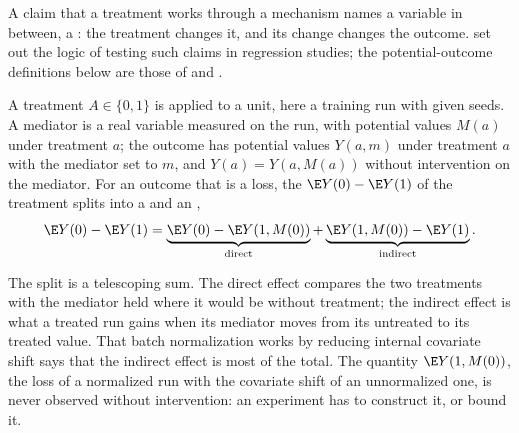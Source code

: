 \begin{refsection}
A claim that a treatment works through a mechanism names a variable in between, a : the treatment changes it, and its change changes the outcome. \Textcite{BaronKenny1986} set out the logic of testing such claims in regression studies; the potential-outcome definitions below are those of \textcite{RobinsGreenland1992} and \textcite{Pearl2001}.

\begin{definition}\label{def:mechanisms:effects}
A treatment $A\in\{0,1\}$ is applied to a unit, here a training run with given seeds. A mediator is a real variable measured on the run, with potential values $M(a)$ under treatment $a$; the outcome has potential values $Y(a,m)$ under treatment $a$ with the mediator set to $m$, and $Y(a)=Y(a,M(a))$ without intervention on the mediator. For an outcome that is a loss, the  $\E Y(0)-\E Y(1)$ of the treatment splits into a  and an ,
\begin{equation}\label{eq:mechanisms:split}
\E Y(0)-\E Y(1)=\underbrace{\E Y(0)-\E Y(1,M(0))}_{\text{direct}}+\underbrace{\E Y(1,M(0))-\E Y(1)}_{\text{indirect}} .
\end{equation}
\end{definition}

The split is a telescoping sum. The direct effect compares the two treatments with the mediator held where it would be without treatment; the indirect effect is what a treated run gains when its mediator moves from its untreated to its treated value. That batch normalization works by reducing internal covariate shift says that the indirect effect is most of the total. The quantity $\E Y(1,M(0))$, the loss of a normalized run with the covariate shift of an unnormalized one, is never observed without intervention: an experiment has to construct it, or bound it.


\end{refsection}

